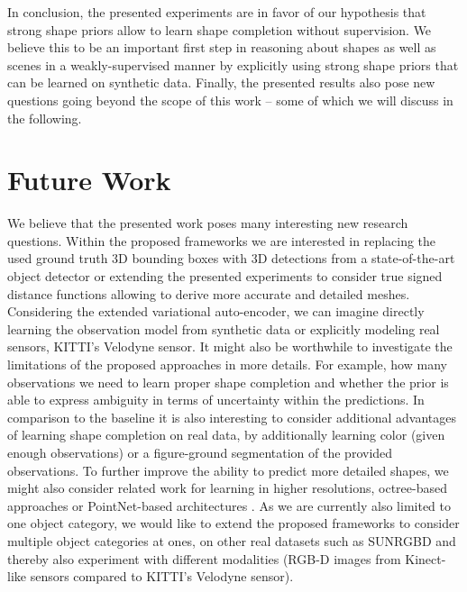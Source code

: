 In conclusion, the presented experiments are in favor of our hypothesis
that strong shape priors allow to learn shape completion without supervision.
We believe this to be an important first step in reasoning about shapes as well
as scenes in a weakly-supervised manner by explicitly using strong shape priors
that can be learned on synthetic data. Finally, the presented results also
pose new questions going beyond the scope of this work -- some of which
we will discuss in the following.

\section{Future Work}
\label{sec:future-work}


We believe that the
presented work poses many interesting new research questions.
Within the proposed frameworks we are \eg interested in replacing the
used ground truth 3D bounding boxes with 3D detections from a state-of-the-art
object detector or extending the presented experiments to consider
true signed distance functions allowing to derive more accurate and detailed meshes.
Considering the extended variational auto-encoder, we can imagine directly
learning the observation model from synthetic data or explicitly modeling
real sensors, \eg KITTI's Velodyne sensor.
It might also be worthwhile to investigate the limitations of the proposed approaches
in more details. For example, how many observations we need to
learn proper shape completion and whether the prior is able to express ambiguity
in terms of uncertainty within the predictions. In comparison to the baseline it
is also interesting to consider additional advantages of learning shape completion
on real data, \eg by additionally learning color (given enough observations)
or a figure-ground segmentation of the provided observations.
To further improve the ability to predict more detailed shapes,
we might also consider related work for learning in higher resolutions,
\eg octree-based approaches \cite{RieglerGeiger:2016,RieglerGeiger:2017,TatarchenkoBrox:2017}
or PointNet-based architectures \cite{QiSuGuibas:2016a,FanSuGuibas:2016,QiYiSuGuibas:2017}.
As we are currently also limited to one object category, we would like
to extend the proposed frameworks to consider multiple object categories
at ones, \eg on other real datasets such as SUNRGBD \cite{SongXiao:2015}
and thereby also experiment with different modalities (\ie RGB-D images from
Kinect-like sensors compared to KITTI's Velodyne sensor).

